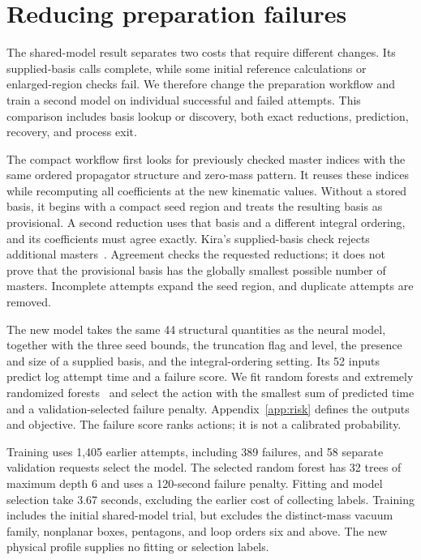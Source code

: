 \section{Reducing preparation failures}
\label{sec:preparation}
The shared-model result separates two costs that require different changes. Its supplied-basis calls complete, while some initial reference calculations or enlarged-region checks fail. We therefore change the preparation workflow and train a second model on individual successful and failed attempts. This comparison includes basis lookup or discovery, both exact reductions, prediction, recovery, and process exit.

The compact workflow first looks for previously checked master indices with the same ordered propagator structure and zero-mass pattern. It reuses these indices while recomputing all coefficients at the new kinematic values. Without a stored basis, it begins with a compact seed region and treats the resulting basis as provisional. A second reduction uses that basis and a different integral ordering, and its coefficients must agree exactly. Kira's supplied-basis check rejects additional masters~\cite{Kira3}. Agreement checks the requested reductions; it does not prove that the provisional basis has the globally smallest possible number of masters. Incomplete attempts expand the seed region, and duplicate attempts are removed.

The new model takes the same 44 structural quantities as the neural model, together with the three seed bounds, the truncation flag and level, the presence and size of a supplied basis, and the integral-ordering setting. Its 52 inputs predict log attempt time and a failure score. We fit random forests and extremely randomized forests~\cite{Breiman2001Forest,Geurts2006ExtraTrees} and select the action with the smallest sum of predicted time and a validation-selected failure penalty. Appendix~\ref{app:risk} defines the outputs and objective. The failure score ranks actions; it is not a calibrated probability.

Training uses 1,405 earlier attempts, including 389 failures, and 58 separate validation requests select the model. The selected random forest has 32 trees of maximum depth 6 and uses a 120-second failure penalty. Fitting and model selection take 3.67 seconds, excluding the earlier cost of collecting labels. Training includes the initial shared-model trial, but excludes the distinct-mass vacuum family, nonplanar boxes, pentagons, and loop orders six and above. The new physical profile supplies no fitting or selection labels.

